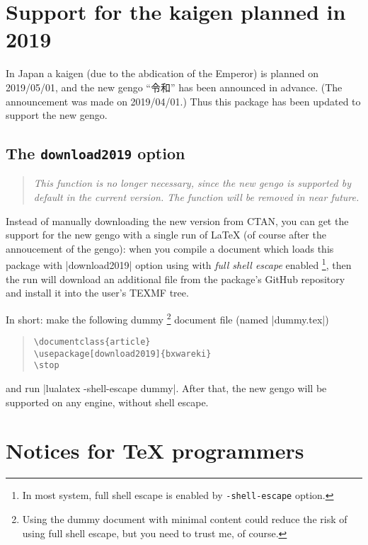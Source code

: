 \documentclass[a4paper]{article}
\newcommand*{\Ja}[1]{{\fIpaex#1}}
\newcommand*{\+}{\hspace{0.25em minus 0.25em}}
\begin{document}
\section{Support for the kaigen planned in 2019}
\label{sec:Kaigen}

In Japan a kaigen (due to the abdication of the Emperor)
is planned on 2019/05/01,
and the new gengo ``\Ja{令和}'' has been announced in advance.
(The announcement was made on 2019/04/01.)
Thus this package has been updated to support the new gengo.

\subsection{The \texttt{download2019} option}
\label{ssec:download2019}

\begin{quote}\itshape
This function is no longer necessary,
since the new gengo is supported by default in the current version.
The function will be removed in near future.
\end{quote}

Instead of manually downloading the new version from CTAN,
you can get the support for the new gengo
with a single run of {\LaTeX}
(of course after the annoucement of the gengo):
when you compile a document which loads this package
with |download2019| option using {\LuaLaTeX}
with \emph{full shell escape} enabled%
\footnote{In most system, full shell escape is enabled
  by \texttt{-shell-escape} option.},
then the run will download an additional file
from the package's GitHub repository
and install it into the user's TEXMF tree.

In short: make the following dummy%
\footnote{Using the dummy document with minimal content
could reduce the risk of using full shell escape,
but you need to trust me, of course.}
document file (named |dummy.tex|)
\begin{quote}\small\begin{verbatim}
\documentclass{article}
\usepackage[download2019]{bxwareki}
\stop
\end{verbatim}\end{quote}
and run |lualatex -shell-escape dummy|.
After that, the new gengo will be supported
on any engine, without shell escape.

\section{Notices for {\TeX} programmers}
\label{sec:Allez}
\end{document}

